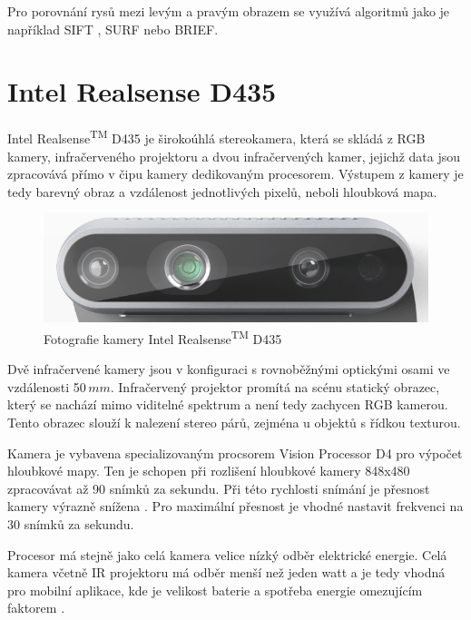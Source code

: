 \documentclass[twoside]{ctuthesis}
\begin{document}
Pro porovnání rysů mezi levým a pravým obrazem se využívá algoritmů jako je například SIFT , SURF  nebo BRIEF.





\section{Intel Realsense D435}
Intel\textregistered{} Realsense\textsuperscript{TM} D435 je širokoúhlá stereokamera, která se skládá z RGB kamery, infračerveného projektoru a dvou infračervených kamer, jejichž data jsou zpracovává přímo v čipu kamery dedikovaným procesorem. Výstupem z kamery je tedy barevný obraz a vzdálenost jednotlivých pixelů, neboli hloubková mapa. 

\begin{figure}
    \centering
    \includegraphics[width = 0.8\linewidth]{pictures/realsense_kamera.png}
    \caption{Fotografie kamery Intel\textregistered{} Realsense\textsuperscript{TM} D435 \cite{Realsense_obrazek}}
    \label{Fig:realsense_pic}
\end{figure}

Dvě infračervené kamery jsou v konfiguraci s rovnoběžnými optickými osami ve vzdálenosti 50$\,\si{mm}$. Infračervený projektor promítá na scénu statický obrazec, který se nachází mimo viditelné spektrum a není tedy zachycen RGB kamerou. Tento obrazec slouží k nalezení stereo párů, zejména u objektů s řídkou texturou.

    Kamera je vybavena specializovaným procsorem Vision Processor D4 pro výpočet hloubkové mapy. Ten je schopen při rozlišení hloubkové kamery 848x480 zpracovávat až 90 snímků za sekundu. Při této rychlosti snímání je přesnost kamery výrazně snížena \cite{keselman2017intel}. Pro maximální přesnost je vhodné nastavit frekvenci na 30 snímků za sekundu. 
    
    Procesor má stejně jako celá kamera velice nízký odběr elektrické energie. Celá kamera včetně IR projektoru má odběr menší než jeden watt a je tedy vhodná pro mobilní aplikace, kde je velikost baterie a spotřeba energie omezujícím faktorem \cite{RealSense_datasheet}. %
\end{document}

